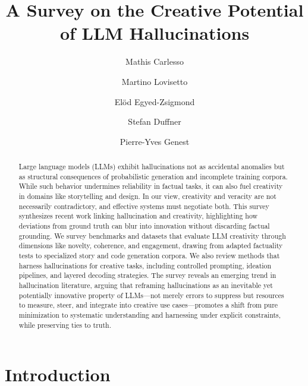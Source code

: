 \documentclass{llncs}
\begin{document}
\title{A Survey on the Creative Potential of LLM Hallucinations }

\author{
  Mathis Carlesso \and
  Martino Lovisetto \and
  Elöd Egyed-Zsigmond\and
  Stefan Duffner\and
  Pierre-Yves Genest
}

\maketitle

\begin{abstract}
Large language models (LLMs) exhibit hallucinations not as accidental anomalies but as structural consequences of probabilistic generation and incomplete training corpora.
While such behavior undermines reliability in factual tasks, it can also fuel creativity in domains like storytelling and design. 
In our view, creativity and veracity are not necessarily contradictory, and effective systems must negotiate both.
This survey synthesizes recent work linking hallucination and creativity, highlighting how deviations from ground truth can blur into innovation without discarding factual grounding. 
We survey benchmarks and datasets that evaluate LLM creativity through dimensions like novelty, coherence, and engagement, drawing from adapted factuality tests to specialized story and code generation corpora.
We also review methods that harness hallucinations for creative tasks, including controlled prompting, ideation pipelines, and layered decoding strategies.
The survey reveals an emerging trend in hallucination literature, arguing that reframing hallucinations as an inevitable yet potentially innovative property of LLMs—not merely errors to suppress but resources to measure, steer, and integrate into creative use cases—promotes a shift from pure minimization to systematic understanding and harnessing under explicit constraints, while preserving ties to truth.
\end{abstract}


\section{Introduction}
\end{document}

